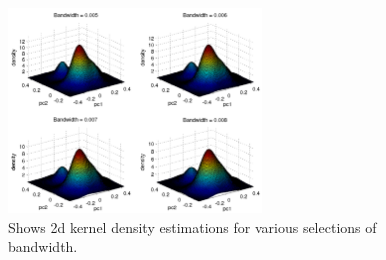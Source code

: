 \begin{figure}[!htbp]
  \centering
  \includegraphics[width=0.6\textwidth]{./images/q373dkde2}
  \caption{Shows 2d kernel density estimations for various selections of bandwidth.}
  \label{fig:q373dkde2}
\end{figure}

